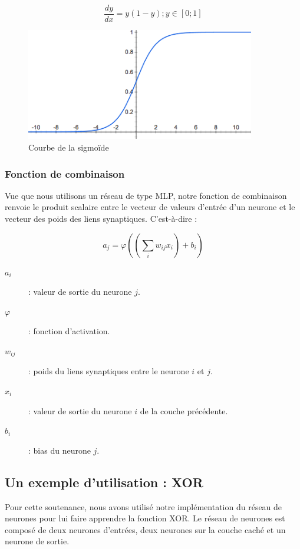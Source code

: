 \documentclass[11pt]{report}
\begin{document}
\[ \dfrac{dy}{dx} = y\left(1-y\right) ; y \in [0; 1] \]

\begin{figure}[htbp]
\centering
\includegraphics[width=10cm]{sigmoide.png}
\caption{Courbe de la sigmoïde}
\end{figure}

\subsubsection{Fonction de combinaison}

Vue que nous utilisons un réseau de type MLP, notre fonction de combinaison renvoie le produit scalaire entre le vecteur de valeurs d'entrée d'un neurone et le vecteur des poids des liens synaptiques. C'est-à-dire :

\[ a_{j} = \varphi \left( \left( \sum_{i} w_{ij} x_{i} \right) + b_{i} \right) \]

\begin{description}
\item[$a_{i}$] : valeur de sortie du neurone $j$.
\item[$\varphi$] : fonction d'activation.
\item[$w_{ij}$] : poids du liens synaptiques entre le neurone $i$ et $j$.
\item[$x_{i}$] : valeur de sortie du neurone $i$ de la couche précédente.
\item[$b_{i}$] : bias du neurone $j$.
\end{description}

\subsection{Un exemple d'utilisation : XOR}

Pour cette soutenance, nous avons utilisé notre implémentation du réseau de neurones pour lui faire apprendre la fonction XOR. Le réseau de neurones est composé de deux neurones d'entrées, deux neurones sur la couche caché et un neurone de sortie.
\end{document}
